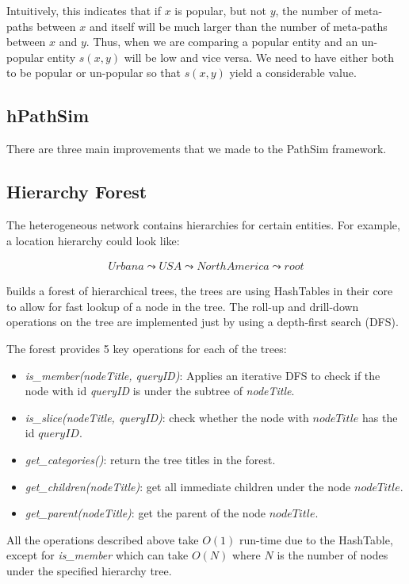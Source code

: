 Intuitively, this indicates that if $x$ is popular, but not $y$, the number of
meta-paths between $x$ and itself will be much larger than the number of
meta-paths between $x$ and $y$. Thus, when we are comparing a popular entity
and an un-popular entity $s(x,y)$ will be low and vice versa. We need to have
either both to be popular or un-popular so that $s(x,y)$ yield a considerable
value.

\subsection{hPathSim}

There are three main improvements that we made to the PathSim framework.

\subsection{Hierarchy Forest}

The heterogeneous network contains hierarchies for certain entities. For example,
a location hierarchy could look like:

\begin{align*}
Urbana \leadsto USA \leadsto North America \leadsto root
\end{align*}

\h builds a forest of hierarchical trees, the trees are using HashTables in their core to 
allow for fast lookup of a node in the tree. The roll-up and drill-down operations
on the tree are implemented just by using a depth-first search (DFS).

The forest provides 5 key operations for each of the trees:
\begin{itemize}
    \item \textit{is\_member(nodeTitle, queryID)}: Applies an iterative DFS to check if 
    the node with id \textit{queryID} is under the subtree of \textit{nodeTitle}.
    \item \textit{is\_slice(nodeTitle, queryID)}: check whether the node with $nodeTitle$
    has the id $queryID$.
    \item \textit{get\_categories()}: return the tree titles in the forest.
    \item \textit{get\_children(nodeTitle)}: get all immediate children under the node 
    $nodeTitle$.
    \item \textit{get\_parent(nodeTitle)}: get the parent of the node $nodeTitle$.
\end{itemize}

All the operations described above take $O(1)$ run-time due to the HashTable, except for 
\textit{is\_member} which can take $O(N)$ where $N$ is the number of nodes under the specified 
hierarchy tree.
